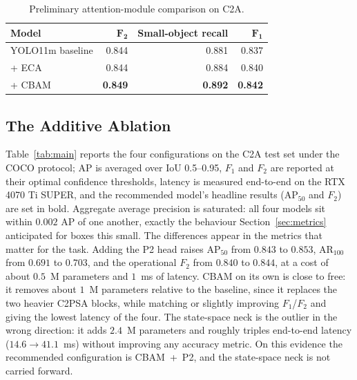 \begin{table}[H]
  \centering
  \caption{Preliminary attention-module comparison on C2A.}
  \label{tab:eca}
  \begin{tabular}{@{}l r r r@{}}
    \toprule
    \textbf{Model} & \textbf{$\symbf{F_2}$} & \textbf{Small-object recall} & \textbf{$\symbf{F_1}$} \\
    \midrule
    YOLO11m baseline & 0.844 & 0.881 & 0.837 \\
    + ECA            & 0.844 & 0.884 & 0.840 \\
    + CBAM           & \textbf{0.849} & \textbf{0.892} & \textbf{0.842} \\
    \bottomrule
  \end{tabular}
\end{table}

\subsection{The Additive Ablation}
Table~\ref{tab:main} reports the four configurations on the C2A test set
under the COCO protocol; AP is averaged over IoU 0.5--0.95, $F_1$ and $F_2$
are reported at their optimal confidence thresholds, latency is measured
end-to-end on the RTX 4070 Ti SUPER, and the recommended model's headline
results ($\mathrm{AP}_{50}$ and $F_2$) are set in bold. Aggregate average
precision is saturated: all
four models sit within $0.002$ AP of one another, exactly the behaviour
Section~\ref{sec:metrics} anticipated for boxes this small. The differences
appear in the metrics that matter for the task. Adding the P2 head raises
$\mathrm{AP}_{50}$ from $0.843$ to $0.853$, $\mathrm{AR}_{100}$ from $0.691$
to $0.703$, and the operational $F_2$ from $0.840$ to $0.844$, at a cost of
about $0.5$~M parameters and $1$~ms of latency. CBAM on its own is close to
free: it removes about $1$~M parameters relative to the baseline, since it
replaces the two heavier C2PSA blocks, while matching or slightly improving
$F_1$/$F_2$ and giving the lowest latency of the four. The state-space neck
is the outlier in the wrong direction: it adds $2.4$~M parameters and
roughly triples end-to-end latency ($14.6 \to 41.1$~ms) without improving
any accuracy metric. On this evidence the recommended configuration is
CBAM~+~P2, and the state-space neck is not carried forward.


